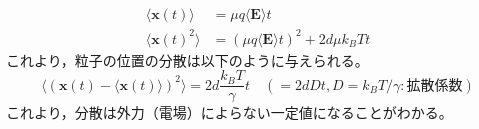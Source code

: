 \documentclass[autodetect-engine,dvi=dvipdfmx,a4paper,ja=standard,oneside,openany,11pt]{bxjsbook}
\begin{document}
\begin{equation}
  \begin{split}
    \langle\bm{x}(t)\rangle   & =\mu q\langle\bm{E}\rangle t                    \\
    \langle\bm{x}(t)^2\rangle & =(\mu q \langle\bm{E}\rangle t)^2+2d\mu k_B T t
  \end{split}
  \label{eq:Langevin_overdamped_average}
\end{equation}
これより，粒子の位置の分散は以下のように与えられる。
\begin{equation}
  \langle(\bm{x}(t)-\langle\bm{x}(t)\rangle)^2\rangle=2d \frac{k_B T}{\gamma} t \quad (=2d D t, D=k_B T/\gamma:\mathrm{拡散係数})
  \label{eq:Langevin_overdamped_variance}
\end{equation}
これより，分散は外力（電場）によらない一定値になることがわかる。
\end{document}
